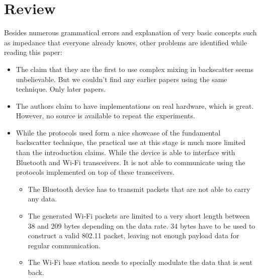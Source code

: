 \documentclass{article}
\begin{document}
\section{Review}
Besides numerous grammatical errors and explanation of very basic concepts such as impedance that everyone already knows, other problems are identified while reading this paper:
\begin{itemize}
    \item
    The claim that they are the first to use complex mixing in backscatter seems unbelievable. But we couldn't find any earlier papers using the same technique. Only later papers.
    \item
    The authors claim to have implementations on real hardware, which is great. However, no source is available to repeat the experiments.
    \item
    While the protocols used form a nice showcase of the fundamental backscatter technique, the practical use at this stage is much more limited than the introduction claims. While the device is able to interface with Bluetooth and Wi-Fi transceivers. It is not able to communicate using the protocols implemented on top of these transceivers.
    \begin{itemize}
        \item The Bluetooth device has to transmit packets that are not able to carry any data. 
        \item The generated Wi-Fi packets are limited to a very short length between 38 and 209 bytes depending on the data rate. 34 bytes have to be used to construct a valid 802.11 packet, leaving not enough payload data for regular communication.
        \item 
        The Wi-Fi base station needs to specially modulate the data that is sent back.
    \end{itemize}
    
\end{itemize}

\printbibliography
\end{document}

